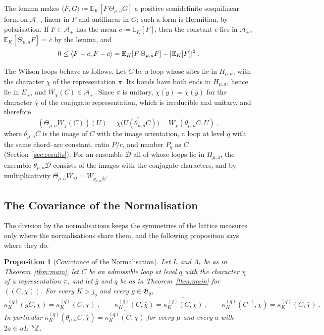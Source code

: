 \documentclass[11pt]{preprint}
\DeclarePairedDelimiter{\abs}{\lvert}{\rvert}
\numberwithin{equation}{section}
\newtheorem{proposition}[theorem]{Proposition}
\theoremstyle{definition}
\theoremstyle{remark}
\theoremstyle{plain}
\begin{document}
The lemma makes $\langle F, G\rangle \coloneqq \mathbb E_K[F\,\Theta_{\mu,a}G]$ a positive semidefinite sesquilinear form on $\mathcal A_+$, linear in $F$ and antilinear in $G$; such a form is Hermitian, by polarisation. If $F \in \mathcal A_+$ has the mean $c \coloneqq \mathbb E_K[F]$, then the constant $c$ lies in $\mathcal A_+$, $\mathbb E_K[\Theta_{\mu,a}F] = \bar c$ by the lemma, and
\begin{equation}\label{eq:reflection-covariance}
    0 \leq \langle F - c, F - c\rangle = \mathbb E_K[F\,\Theta_{\mu,a}F] - \abs{\mathbb E_K[F]}^2\;.
\end{equation}

The Wilson loops behave as follows. Let $C$ be a loop whose sites lie in $H_{\mu,a}$, with the character $\chi$ of the representation $\pi$. Its bonds have both ends in $H_{\mu,a}$, hence lie in $E_+$, and $W_\chi(C) \in \mathcal A_+$. Since $\pi$ is unitary, $\overline{\chi(g)} = \bar\chi(g)$ for the character $\bar\chi$ of the conjugate representation, which is irreducible and unitary, and therefore
\begin{equation}\label{eq:reflected-loop}
    (\Theta_{\mu,a}W_\chi(C))(U) = \overline{\chi\bigl(U(\theta_{\mu,a}C)\bigr)} = W_{\bar\chi}(\theta_{\mu,a}C; U)\;,
\end{equation}
where $\theta_{\mu,a}C$ is the image of $C$ with the image orientation, a loop at level $q$ with the same chord--arc constant, ratio $P/r$, and number $P_q$ as $C$ (Section~\ref{sec:results}). For an ensemble $\mathcal D$ all of whose loops lie in $H_{\mu,a}$, the ensemble $\theta_{\mu,a}\bar{\mathcal D}$ consists of the images with the conjugate characters, and by multiplicativity $\Theta_{\mu,a}W_{\mathcal D} = W_{\theta_{\mu,a}\bar{\mathcal D}}$.

\subsection{The Covariance of the Normalisation}\label{sec:reflection-normalisation}

The division by the normalisations keeps the symmetries of the lattice measures only where the normalisations share them, and the following proposition says where they do.

\begin{proposition}[Covariance of the Normalisation]\label{prop:reflection-normalisation}
Let $L$ and $\Lambda_*$ be as in Theorem~\ref{thm:main}, let $C$ be an admissible loop at level $q$ with the character $\chi$ of a representation $\pi$, and let $\bar g$ and $q$ be as in Theorem~\ref{thm:main} for $((C, \chi))$. For every $K > j_q$ and every $g \in \mathfrak G_q$,
\begin{equation}\label{eq:reflection-normalisation}
    \kappa^{(q)}_K(gC, \chi) = \kappa^{(q)}_K(C, \chi)\;,
    \qquad
    \kappa^{(q)}_K(C, \bar\chi) = \overline{\kappa^{(q)}_K(C, \chi)}\;,
    \qquad
    \kappa^{(q)}_K(C^{-1}, \chi) = \kappa^{(q)}_K(C, \bar\chi)\;.
\end{equation}
In particular $\kappa^{(q)}_K(\theta_{\mu,a}C, \bar\chi) = \overline{\kappa^{(q)}_K(C, \chi)}$ for every $\mu$ and every $a$ with $2a \in uL^{-q}\mathbb Z$.
\end{proposition}
\end{document}

